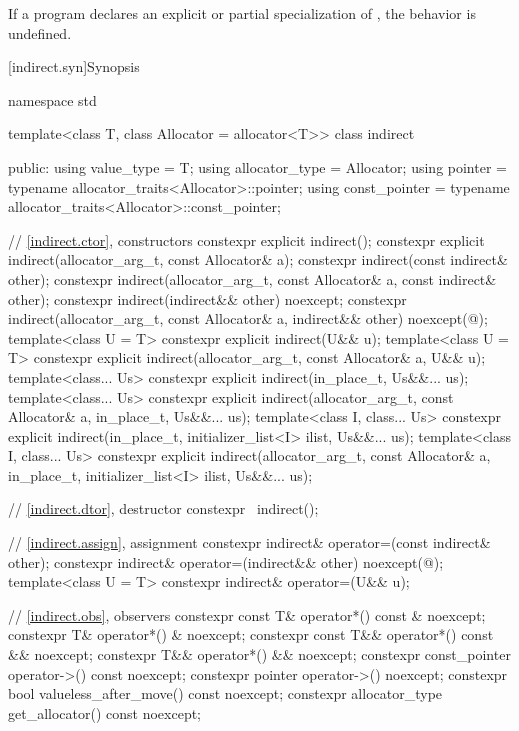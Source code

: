 \pnum
If a program declares an explicit or partial specialization of ,
the behavior is undefined.

[indirect.syn]{Synopsis}

%
\begin{codeblock}
namespace std {
  template<class T, class Allocator = allocator<T>>
  class indirect {
  public:
    using value_type = T;
    using allocator_type = Allocator;
    using pointer = typename allocator_traits<Allocator>::pointer;
    using const_pointer = typename allocator_traits<Allocator>::const_pointer;

    // \ref{indirect.ctor}, constructors
    constexpr explicit indirect();
    constexpr explicit indirect(allocator_arg_t, const Allocator& a);
    constexpr indirect(const indirect& other);
    constexpr indirect(allocator_arg_t, const Allocator& a, const indirect& other);
    constexpr indirect(indirect&& other) noexcept;
    constexpr indirect(allocator_arg_t, const Allocator& a, indirect&& other)
      noexcept(@\seebelow@);
    template<class U = T>
      constexpr explicit indirect(U&& u);
    template<class U = T>
      constexpr explicit indirect(allocator_arg_t, const Allocator& a, U&& u);
    template<class... Us>
      constexpr explicit indirect(in_place_t, Us&&... us);
    template<class... Us>
      constexpr explicit indirect(allocator_arg_t, const Allocator& a,
                                  in_place_t, Us&&... us);
    template<class I, class... Us>
      constexpr explicit indirect(in_place_t, initializer_list<I> ilist, Us&&... us);
    template<class I, class... Us>
      constexpr explicit indirect(allocator_arg_t, const Allocator& a,
                                  in_place_t, initializer_list<I> ilist, Us&&... us);

    // \ref{indirect.dtor}, destructor
    constexpr ~indirect();

    // \ref{indirect.assign}, assignment
    constexpr indirect& operator=(const indirect& other);
    constexpr indirect& operator=(indirect&& other) noexcept(@\seebelow@);
    template<class U = T>
      constexpr indirect& operator=(U&& u);

    // \ref{indirect.obs}, observers
    constexpr const T& operator*() const & noexcept;
    constexpr T& operator*() & noexcept;
    constexpr const T&& operator*() const && noexcept;
    constexpr T&& operator*() && noexcept;
    constexpr const_pointer operator->() const noexcept;
    constexpr pointer operator->() noexcept;
    constexpr bool valueless_after_move() const noexcept;
    constexpr allocator_type get_allocator() const noexcept;

}}
\end{codeblock}
